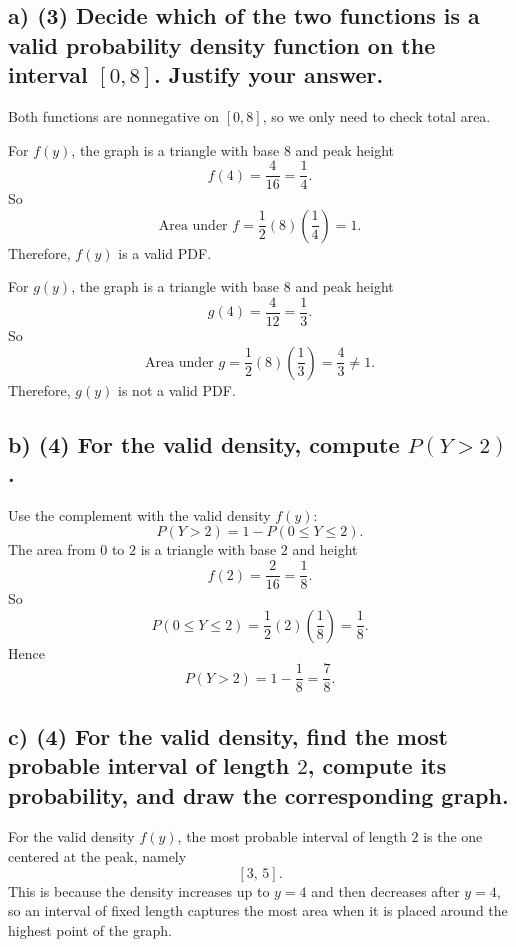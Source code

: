 \subsection*{a) \textbf{(3)} Decide which of the two functions is a valid probability density function on the interval $[0,8]$. Justify your answer.}
\label{subsec:basic-symmetric-triangular-density-c3-a}
Both functions are nonnegative on $[0,8]$, so we only need to check total area.

For $f(y)$, the graph is a triangle with base $8$ and peak height
\[
f(4)=\frac{4}{16}=\frac14.
\]
So
\[
\text{Area under }f=\frac12(8)\left(\frac14\right)=1.
\]
Therefore, $f(y)$ is a valid PDF.

For $g(y)$, the graph is a triangle with base $8$ and peak height
\[
g(4)=\frac{4}{12}=\frac13.
\]
So
\[
\text{Area under }g=\frac12(8)\left(\frac13\right)=\frac{4}{3}\ne 1.
\]
Therefore, $g(y)$ is not a valid PDF.


\subsection*{b) \textbf{(4)} For the valid density, compute $P(Y>2)$.}
\label{subsec:basic-symmetric-triangular-density-c3-b}
 Use the complement with the valid density $f(y)$:
\[
P(Y>2)=1-P(0\le Y\le 2).
\]
The area from $0$ to $2$ is a triangle with base $2$ and height
\[
f(2)=\frac{2}{16}=\frac18.
\]
So
\[
P(0\le Y\le 2)=\frac12(2)\left(\frac18\right)=\frac18.
\]
Hence
\[
P(Y>2)=1-\frac18=\frac78.
\]


\subsection*{c) \textbf{(4)} For the valid density, find the most probable interval of length $2$, compute its probability, and draw the corresponding graph.}
\label{subsec:basic-symmetric-triangular-density-c3-c}
For the valid density $f(y)$, the most probable interval of length $2$ is the one centered at the peak, namely
\[
[3,\,5].
\]
This is because the density increases up to $y=4$ and then decreases after $y=4$, so an interval of fixed length captures the most area when it is placed around the highest point of the graph.

